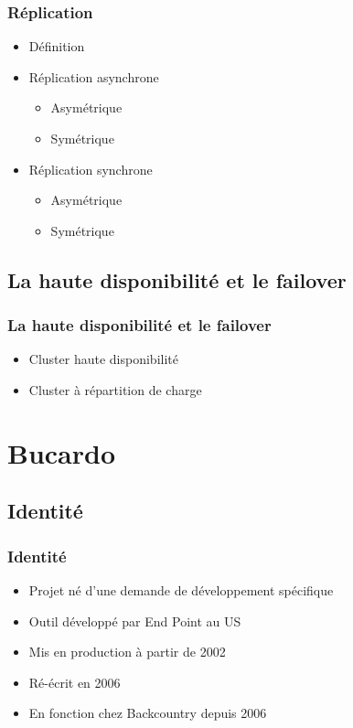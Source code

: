 \documentclass[utf8]{beamer}
\begin{document}
\begin{frame}
  \frametitle{Réplication} 

  \begin{itemize}
  \item Définition
  \end{itemize}
  
  \begin{itemize}
  \item Réplication asynchrone
  \begin{itemize}
    \item Asymétrique
    \item Symétrique
  \end{itemize}
  \end{itemize}

  \begin{itemize}
  \item Réplication synchrone
  \begin{itemize}
    \item Asymétrique
    \item Symétrique
  \end{itemize}
    
  \end{itemize}
\end{frame}

\subsection{La haute disponibilité et le failover}
\begin{frame}
  \frametitle{La haute disponibilité et le failover}

  \begin{itemize}
  \item Cluster haute disponibilité
  \item Cluster à répartition de charge
  \end{itemize}
\end{frame}


\section{Bucardo}

\subsection{Identité}

\begin{frame}
  \frametitle{Identité}
  \begin{itemize}
  \item Projet né d'une demande de développement spécifique
  \item Outil développé par End Point au US
  \item Mis en production à partir de 2002
  \item Ré-écrit en 2006
  \item En fonction chez Backcountry depuis 2006
  \end{itemize}

\end{frame}
\end{document}
